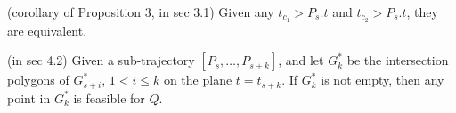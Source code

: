 
 
\begin{cor}
    (corollary of Proposition 3, in sec 3.1) Given any $t_{c_1}> P_s.t$ and $t_{c_2} > P_s.t$, they are equivalent.
\end{cor}
 
(in sec 4.2) Given a sub-trajectory ${[P_s, \ldots, P_{s+k}]}$, and let $G^*_k$ be the intersection polygons of $G^*_{s+i}$, $1<i\le k$ on the plane $t=t_{s+k}$. If $G^*_k$ is not empty, then any point in $G^*_k$ is feasible for $Q$.




